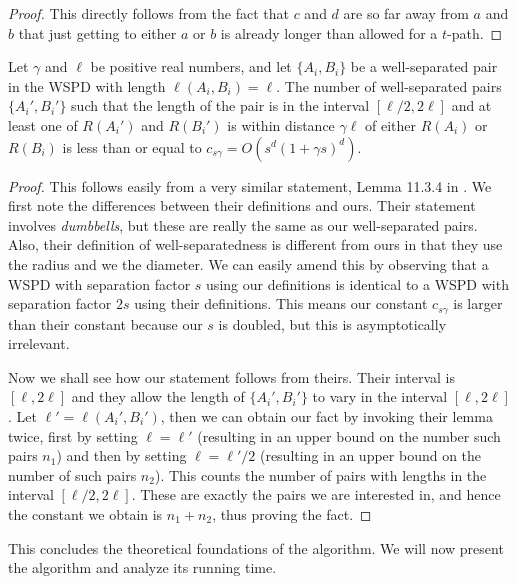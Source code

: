 \documentclass[runningheads,envcountsame,oribibl,orivec]{llncs}
\begin{document}
\begin{proof}
This directly follows from the fact that $c$ and $d$ are so far away from $a$ and $b$ that just getting to either $a$ or $b$ is already longer than allowed for a $t$-path.
\end{proof}

\begin{fact} \label{fact:packing}
Let $\gamma$ and $\ell$ be positive real numbers, and let $\{ A_i, B_i \}$ be a well-separated pair in the WSPD with length $\ell(A_i, B_i) = \ell$. The number of well-separated pairs $\{ A_i', B_i' \}$ such that the length of the pair is in the interval $[\ell/2,2\ell]$ and at least one of $R(A_i')$ and $R(B_i')$ is within distance $\gamma \ell$ of either $R(A_i)$ or $R(B_i)$ is less than or equal to $c_{s \gamma} = O\left(s^d(1+\gamma s)^d\right)$.
\end{fact}

\begin{proof}
This follows easily from a very similar statement, Lemma 11.3.4 in \cite{Narasimhan:2007:GSN:1208237}. We first note the differences between their definitions and ours. Their statement involves \emph{dumbbells}, but these are really the same as our well-separated pairs. Also, their definition of well-separatedness is different from ours in that they use the radius and we the diameter. We can easily amend this by observing that a WSPD with separation factor $s$ using our definitions is identical to a WSPD with separation factor $2s$ using their definitions. This means our constant $c_{s \gamma}$ is larger than their constant because our $s$ is doubled, but this is asymptotically irrelevant.

Now we shall see how our statement follows from theirs. Their interval is $[\ell, 2\ell]$ and they allow the length of $\{ A_i', B_i' \}$ to vary in the interval $[\ell, 2\ell]$. Let $\ell' = \ell(A_i', B_i')$, then we can obtain our fact by invoking their lemma twice, first by setting $\ell = \ell'$ (resulting in an upper bound on the number such pairs $n_1$) and then by setting $\ell = \ell'/2$ (resulting in an upper bound on the number of such pairs $n_2$). This counts the number of pairs with lengths in the interval $[\ell/2, 2\ell]$. These are exactly the pairs we are interested in, and hence the constant we obtain is $n_1 + n_2$, thus proving the fact.
\end{proof}

This concludes the theoretical foundations of the algorithm. We will now present the algorithm and analyze its running time.
\end{document}
